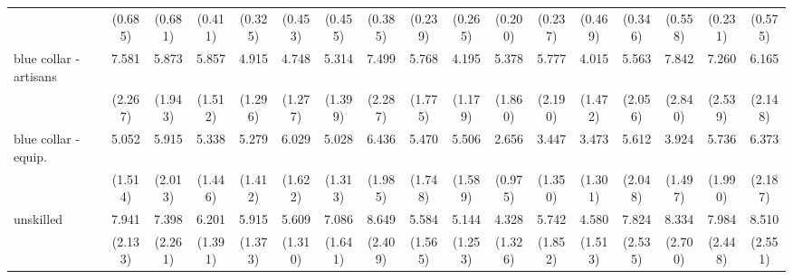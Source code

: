 {\begin{tabular}{l*{16}{c}}
                    &     (0.685)         &     (0.681)         &     (0.411)         &     (0.325)         &     (0.453)         &     (0.455)         &     (0.385)         &     (0.239)         &     (0.265)         &     (0.200)         &     (0.237)         &     (0.469)         &     (0.346)         &     (0.558)         &     (0.231)         &     (0.575)         \\
[1em]
blue collar - artisans&       7.581\sym{***}&       5.873\sym{***}&       5.857\sym{***}&       4.915\sym{***}&       4.748\sym{***}&       5.314\sym{***}&       7.499\sym{***}&       5.768\sym{***}&       4.195\sym{***}&       5.378\sym{***}&       5.777\sym{***}&       4.015\sym{***}&       5.563\sym{***}&       7.842\sym{***}&       7.260\sym{***}&       6.165\sym{***}\\
                    &     (2.267)         &     (1.943)         &     (1.512)         &     (1.296)         &     (1.277)         &     (1.399)         &     (2.287)         &     (1.775)         &     (1.179)         &     (1.860)         &     (2.190)         &     (1.472)         &     (2.056)         &     (2.840)         &     (2.539)         &     (2.148)         \\
[1em]
blue collar - equip.&       5.052\sym{***}&       5.915\sym{***}&       5.338\sym{***}&       5.279\sym{***}&       6.029\sym{***}&       5.028\sym{***}&       6.436\sym{***}&       5.470\sym{***}&       5.506\sym{***}&       2.656\sym{**} &       3.447\sym{**} &       3.473\sym{***}&       5.612\sym{***}&       3.924\sym{***}&       5.736\sym{***}&       6.373\sym{***}\\
                    &     (1.514)         &     (2.013)         &     (1.446)         &     (1.412)         &     (1.622)         &     (1.313)         &     (1.985)         &     (1.748)         &     (1.589)         &     (0.975)         &     (1.350)         &     (1.301)         &     (2.048)         &     (1.497)         &     (1.990)         &     (2.187)         \\
[1em]
unskilled           &       7.941\sym{***}&       7.398\sym{***}&       6.201\sym{***}&       5.915\sym{***}&       5.609\sym{***}&       7.086\sym{***}&       8.649\sym{***}&       5.584\sym{***}&       5.144\sym{***}&       4.328\sym{***}&       5.742\sym{***}&       4.580\sym{***}&       7.824\sym{***}&       8.334\sym{***}&       7.984\sym{***}&       8.510\sym{***}\\
                    &     (2.133)         &     (2.261)         &     (1.391)         &     (1.373)         &     (1.310)         &     (1.641)         &     (2.409)         &     (1.565)         &     (1.253)         &     (1.326)         &     (1.852)         &     (1.513)         &     (2.535)         &     (2.700)         &     (2.448)         &     (2.551)         \\

\end{tabular}}
